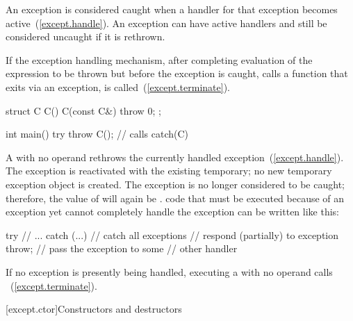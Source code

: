\pnum
{}%
%
%
An exception is considered caught when a handler for that exception
becomes active~(\ref{except.handle}).
\enternote
An exception can have active handlers and still be considered uncaught if
it is rethrown.
\exitnote

\pnum
{}%
%
If the exception handling mechanism, after completing evaluation of the expression
to be thrown but before the exception is caught, calls a function that exits via an
exception,  is called~(\ref{except.terminate}). \enterexample

\begin{codeblock}
struct C {
  C() { }
  C(const C&) { throw 0; }
};

int main() {
  try {
    throw C();      // calls 
  } catch(C) { }
}
\end{codeblock}

\exitexample

\pnum
{}%
A
with no operand rethrows the currently handled exception~(\ref{except.handle}).
The exception is reactivated with the existing temporary;
no new temporary exception object is created.
The exception
is no longer considered to be caught; therefore, the value
of
will again be
.
\enterexample
code that must be executed because of an exception yet cannot
completely handle the exception can be written like this:
\begin{codeblock}
try {
    // ...
} catch (...) {     // catch all exceptions
  // respond (partially) to exception
  throw;            // pass the exception to some
                    // other handler
}
\end{codeblock}
\exitexample

\pnum
{}%
%
%
If no exception is presently being handled,
executing a
with no operand calls
~(\ref{except.terminate}).


[except.ctor]{Constructors and destructors}%
%
%
%

